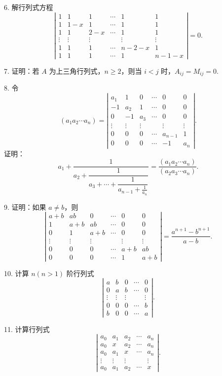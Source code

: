 \documentclass[UTF8,12pt,a4paper,fontset=fandol]{ctexart}
\begin{document}
6. 解行列式方程
\[
\left|\begin{array}{cccccc}
1&1&1&\cdots&1&1\\
1&1-x&1&\cdots&1&1\\
1&1&2-x&\cdots&1&1\\
\vdots&\vdots&\vdots&&\vdots&\vdots\\
1&1&1&\cdots&n-2-x&1\\
1&1&1&\cdots&1&n-1-x
\end{array}\right|=0.
\]

7. 证明：若 $A$ 为上三角行列式，$n\ge2$，则当 $i<j$ 时，$A_{ij}=M_{ij}=0$.

8. 令
\[
(a_1a_2\cdots a_n)=
\left|\begin{array}{cccccc}
a_1&1&0&\cdots&0&0\\
-1&a_2&1&\cdots&0&0\\
0&-1&a_3&\cdots&0&0\\
\vdots&\vdots&\vdots&&\vdots&\vdots\\
0&0&0&\cdots&a_{n-1}&1\\
0&0&0&\cdots&-1&a_n
\end{array}\right|.
\]
证明：
\[
a_1+\frac1{a_2+\dfrac1{a_3+\cdots+\dfrac1{a_{n-1}+\frac1{a_n}}}}
=\frac{(a_1a_2\cdots a_n)}{(a_2a_3\cdots a_n)}.
\]

9. 证明：如果 $a\ne b$，则
\[
\left|\begin{array}{cccccc}
a+b&ab&0&\cdots&0&0\\
1&a+b&ab&\cdots&0&0\\
0&1&a+b&\cdots&0&0\\
\vdots&\vdots&\vdots&&\vdots&\vdots\\
0&0&0&\cdots&a+b&ab\\
0&0&0&\cdots&1&a+b
\end{array}\right|
=\frac{a^{n+1}-b^{n+1}}{a-b}.
\]

10. 计算 $n(n>1)$ 阶行列式
\[
\left|\begin{array}{ccccc}
a&b&0&\cdots&0\\
0&a&b&\cdots&0\\
\vdots&\vdots&\vdots&&\vdots\\
0&0&0&\cdots&b\\
b&0&0&\cdots&a
\end{array}\right|.
\]

11. 计算行列式
\[
\left|\begin{array}{ccccc}
a_0&a_1&a_2&\cdots&a_n\\
a_0&x&a_2&\cdots&a_n\\
a_0&a_1&x&\cdots&a_n\\
\vdots&\vdots&\vdots&&\vdots\\
a_0&a_1&a_2&\cdots&x
\end{array}\right|.
\]
\end{document}
